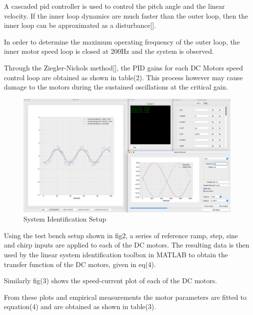         A cascaded pid controller is used to control the pitch angle and the linear velocity. 
        If the inner loop dynamics are much faster than the outer loop, 
        then the inner loop can be approximated as a disturbance[].

        In order to determine the maximum operating frequency of the outer loop, 
        the inner motor speed loop is closed at 200Hz and the system is observed.
        
        Through the Ziegler-Nichols method[], the PID gains for each DC Motors speed control loop 
        are obtained as shown in table(2). This process however may cause damage to the motors 
        during the sustained oscillations at the critical gain. 
       
        \begin{figure}[H]
            \includegraphics[width=\textwidth]{SysIDMotorSetUp.png}
            \caption{System Identification Setup}
        \end{figure}
        
        Using the test bench setup shown in fig2, a series of reference ramp, step, 
        sine and chirp inputs are applied to each of the DC motors. 
        The resulting data is then used by the linear system identification toolbox in MATLAB 
        to obtain the transfer function of the DC motors, given in eq(4).

        Similarly fig(3) shows the speed-current plot of each of the DC motors.

        From these plots and empirical measurements the motor parameters are fitted to equation(4) and are obtained as shown in table(3).

